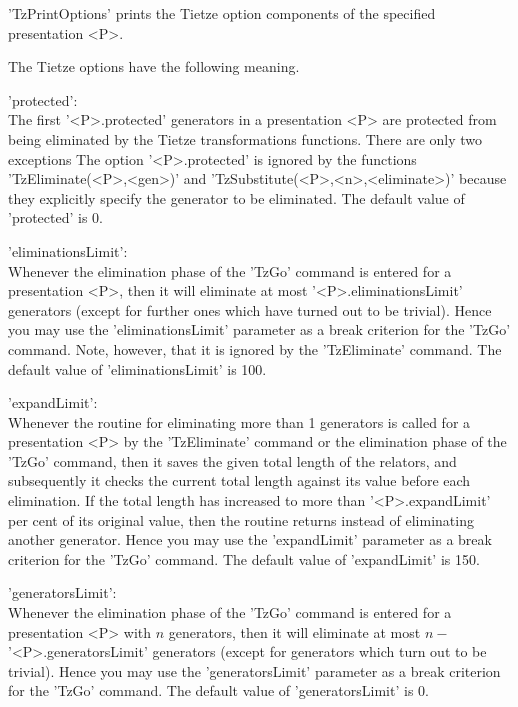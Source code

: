 'TzPrintOptions'  prints the Tietze  option components of  the  specified
presentation <P>.

\vspace{5mm}
The Tietze options have the following meaning.

'protected': \\
        The first  '<P>.protected'  generators in a presentation  <P> are
        protected from  being  eliminated  by the  Tietze transformations
        functions.   There  are  only   two  exceptions{\:}   The  option
        '<P>.protected'     is     ignored      by     the      functions
        'TzEliminate(<P>,<gen>)' and  'TzSubstitute(<P>,<n>,<eliminate>)'
        because they explicitly specify  the generator  to be eliminated.
        The default value of 'protected' is 0.

'eliminationsLimit': \\
        Whenever the elimination  phase of  the 'TzGo' command is entered
        for  a  presentation  <P>,   then  it   will  eliminate  at  most
        '<P>.eliminationsLimit' generators (except for further ones which
        have  turned  out  to   be  trivial).  Hence  you  may  use   the
        'eliminationsLimit' parameter as a break criterion for the 'TzGo'
        command.  Note, however, that it  is ignored by the 'TzEliminate'
        command. The default value of 'eliminationsLimit' is 100.

'expandLimit': \\
        Whenever the routine for eliminating  more than  1  generators is
        called for a presentation <P> by the 'TzEliminate' command or the
        elimination phase of the 'TzGo' command, then it saves the  given
        total  length of the  relators,  and  subsequently it checks  the
        current total length against  its value before  each elimination.
        If the total length  has increased to more than '<P>.expandLimit'
        per cent of its original value, then the  routine returns instead
        of   eliminating  another  generator.   Hence  you  may  use  the
        'expandLimit' parameter  as a  break  criterion  for  the  'TzGo'
        command. The default value of 'expandLimit' is 150.

'generatorsLimit': \\
        Whenever the elimination  phase of the  'TzGo' command is entered
        for  a  presentation  <P>  with  $n$  generators,  then  it  will
        eliminate at most $n - $'<P>.generatorsLimit'  generators (except
        for generators which turn out to  be trivial).  Hence you may use
        the  'generatorsLimit'  parameter  as  a break  criterion for the
        'TzGo' command. The default value of 'generatorsLimit' is 0.

